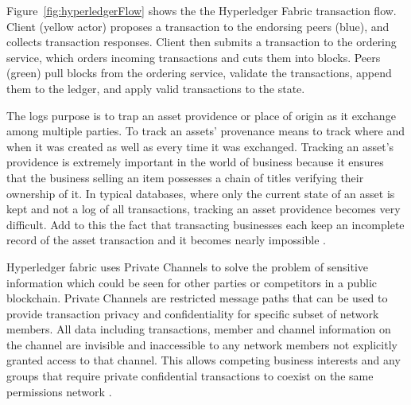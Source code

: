 Figure~\ref{fig:hyperledgerFlow} shows the the Hyperledger Fabric transaction flow. Client (yellow actor) proposes a transaction to the endorsing peers (blue), and collects transaction responses. Client then submits a transaction to the ordering service, which orders incoming transactions and cuts them into blocks. Peers (green) pull blocks from the ordering service, validate the transactions, append them to the ledger, and apply valid transactions to the state.

The logs purpose is to trap an asset providence or place of origin as it exchange among multiple parties. To track an assets' provenance means to track where and when it was created as well as every time it was exchanged. Tracking an asset's providence is extremely important in the world of business because it ensures that the business selling an item possesses a chain of titles verifying their ownership of it. In typical databases, where only the current state of an asset is kept and not a log of all transactions, tracking an asset providence becomes very difficult. Add to this the fact that transacting businesses each keep an incomplete record of the asset transaction and it becomes nearly impossible \cite{blockgeeks2016blockchain}.

Hyperledger fabric uses Private Channels to solve the problem of sensitive information which could be seen for other parties or competitors in a public blockchain. Private Channels are restricted message paths that can be used to provide transaction privacy and confidentiality for specific subset of network members. All data including transactions, member and channel information on the channel are invisible and inaccessible to any network members not explicitly granted access to that channel. This allows competing business interests and any groups that require private confidential transactions to coexist on the same permissions network \cite{brabbani2017hashing}.
